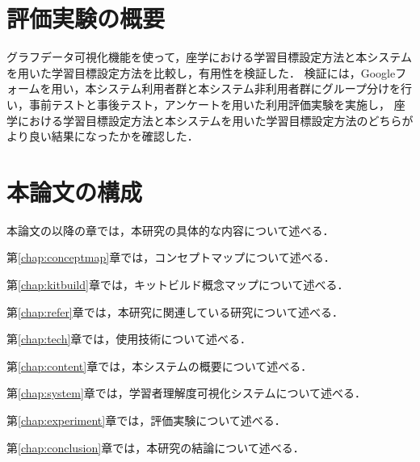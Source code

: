 \section{評価実験の概要}
グラフデータ可視化機能を使って，座学における学習目標設定方法と本システムを用いた学習目標設定方法を比較し，有用性を検証した．
検証には，Googleフォームを用い，本システム利用者群と本システム非利用者群にグループ分けを行い，事前テストと事後テスト，アンケートを用いた利用評価実験を実施し，
座学における学習目標設定方法と本システムを用いた学習目標設定方法のどちらがより良い結果になったかを確認した．

\section{本論文の構成}
本論文の以降の章では，本研究の具体的な内容について述べる．

第\ref{chap:conceptmap}章では，コンセプトマップについて述べる．

第\ref{chap:kitbuild}章では，キットビルド概念マップについて述べる．

第\ref{chap:refer}章では，本研究に関連している研究について述べる．

第\ref{chap:tech}章では，使用技術について述べる．

第\ref{chap:content}章では，本システムの概要について述べる．

第\ref{chap:system}章では，学習者理解度可視化システムについて述べる．

第\ref{chap:experiment}章では，評価実験について述べる．

第\ref{chap:conclusion}章では，本研究の結論について述べる．